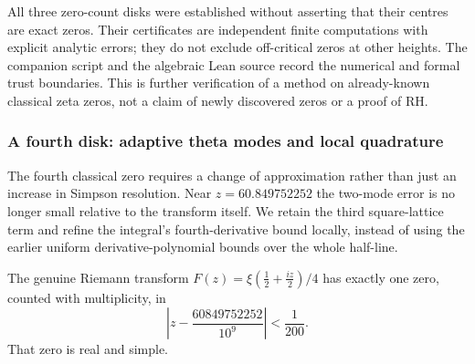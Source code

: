 All three zero-count disks
were established without
asserting that their centres
are exact zeros. Their
certificates are independent
finite computations with
explicit analytic errors;
they do not exclude
off-critical zeros at other
heights. The companion script
and the algebraic Lean source
record the numerical and
formal trust boundaries.
This is further verification
of a method on already-known
classical zeta zeros, not
a claim of newly discovered
zeros or a proof of RH.

\subsubsection{A fourth disk: adaptive theta modes and local quadrature}
\label{subsec:fourthzerocert}
The fourth classical zero requires a change of approximation
rather than just an increase in Simpson resolution.
Near $z=60.849752252$ the two-mode error is no longer small
relative to the transform itself. We retain the third
square-lattice term and refine the integral's fourth-derivative
bound locally, instead of using the earlier uniform
derivative-polynomial bounds over the whole half-line.

\begin{theorem}
\label{thm:fourthzerodisk}
The genuine Riemann transform
$F(z)=\xi(\tfrac12+\tfrac{iz}{2})/4$
has exactly one zero, counted with multiplicity, in
\[
\boxed{\left|z-\frac{60849752252}{10^9}\right|<\frac1{200}.}
\]
That zero is real and simple.
\end{theorem}

